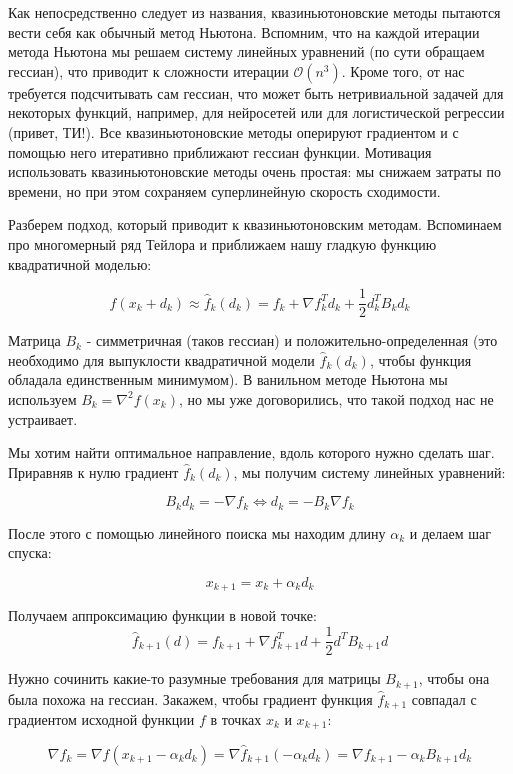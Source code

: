 Как непосредственно следует из названия, квазиньютоновские методы пытаются вести себя как обычный метод Ньютона. Вспомним, что на каждой итерации метода Ньютона мы решаем систему линейных уравнений (по сути обращаем гессиан), что приводит к сложности итерации $\mathcal{O}(n^3)$. Кроме того, от нас требуется подсчитывать сам гессиан, что может быть нетривиальной задачей для некоторых функций, например, для нейросетей или для логистической регрессии (привет, ТИ!). Все квазиньютоновские методы оперируют градиентом и с помощью него итеративно приближают гессиан функции. Мотивация использовать квазиньютоновские методы очень простая: мы снижаем затраты по времени, но при этом сохраняем суперлинейную скорость сходимости.

Разберем подход, который приводит к квазиньютоновским методам. Вспоминаем про многомерный ряд Тейлора и приближаем нашу гладкую функцию квадратичной моделью:

$$
f(x_k + d_k) \approx \widehat{f}_k(d_k) = f_k + \nabla f_k^T d_k + \frac{1}{2} d_k^T B_k d_k
$$

\noindent
Матрица $B_k$ - симметричная (таков гессиан) и положительно-определенная (это необходимо для выпуклости квадратичной модели $\widehat{f}_k(d_k)$, чтобы функция обладала единственным минимумом). В ванильном методе Ньютона мы используем $B_k = \nabla^2 f(x_k)$, но мы уже договорились, что такой подход нас не устраивает.

Мы хотим найти оптимальное направление, вдоль которого нужно сделать шаг. Приравняв к нулю градиент $\widehat{f}_k(d_k)$, мы получим систему линейных уравнений:

$$
B_k d_k = -\nabla f_k \Leftrightarrow d_k = -B_k \nabla f_k
$$

\noindent
После этого с помощью линейного поиска мы находим длину $\alpha_k$ и делаем шаг спуска:

$$
x_{k + 1} = x_k + \alpha_k d_k
$$

\noindent
Получаем аппроксимацию функции в новой точке:
$$
\widehat{f}_{k + 1}(d) = f_{k+1} + \nabla f_{k + 1}^T d + \frac{1}{2} d^T B_{k + 1} d
$$

Нужно сочинить какие-то разумные требования для матрицы $B_{k + 1}$, чтобы она была похожа на гессиан. Закажем, чтобы градиент функция $\widehat{f}_{k+1}$ совпадал с градиентом исходной функции $f$ в точках $x_k$ и $x_{k+1}$:

$$
\nabla f_k = \nabla f (x_{k+1} - \alpha_k d_k) = \nabla \widehat{f}_{k + 1}(-\alpha_k d_k) = \nabla f_{k+1} - \alpha_k B_{k+1} d_k
$$

